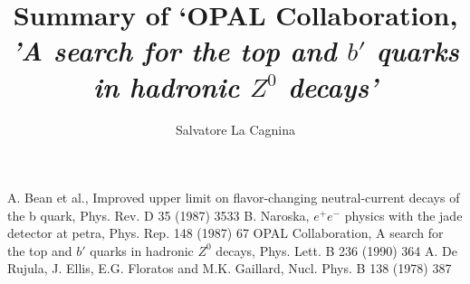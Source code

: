 \documentclass[11pt, twocolumn, a4paper]{article}
\begin{document}
\thispagestyle{empty}

\author{Salvatore La Cagnina}

\title{Summary of `OPAL Collaboration, {\it 'A search for the top and $b'$ quarks in hadronic $Z^0$ decays'}}

\maketitle




\begin{thebibliography}{99}
 A. Bean et al., Improved upper limit on flavor-changing neutral-current decays of the b quark, Phys. Rev. D 35 (1987) 3533
 B. Naroska, $e^+e^-$ physics with the jade detector at petra, Phys. Rep. 148 (1987) 67
 OPAL Collaboration, A search for the top and $b'$ quarks in hadronic $Z^0$ decays, Phys. Lett. B 236 (1990) 364
 A. De Rujula, J. Ellis, E.G. Floratos and M.K. Gaillard, Nucl.
Phys. B 138 (1978) 387
\end{thebibliography}
\end{document}

